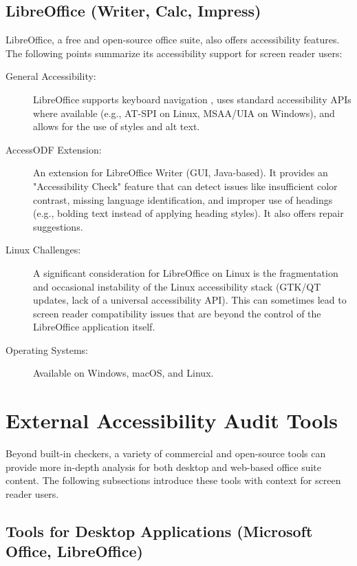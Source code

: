\subsection{LibreOffice (Writer, Calc, Impress)}
\label{subsec:libreoffice-accessibility}
LibreOffice, a free and open-source office suite, also offers accessibility features. The following points summarize its accessibility support for screen reader users:
\begin{description}
    \item[General Accessibility:] LibreOffice supports keyboard navigation \cite{LibreOfficeKeyboard}, uses standard accessibility APIs where available (e.g., AT-SPI on Linux, MSAA/UIA on Windows), and allows for the use of styles and alt text.
    \item[AccessODF Extension:] \cite{AccessODF} An extension for LibreOffice Writer (GUI, Java-based). It provides an "Accessibility Check" feature that can detect issues like insufficient color contrast, missing language identification, and improper use of headings (e.g., bolding text instead of applying heading styles). It also offers repair suggestions.
    \item[Linux Challenges:] A significant consideration for LibreOffice on Linux is the fragmentation and occasional instability of the Linux accessibility stack (GTK/QT updates, lack of a universal accessibility API). This can sometimes lead to screen reader compatibility issues that are beyond the control of the LibreOffice application itself.
    \item[Operating Systems:] Available on Windows, macOS, and Linux.
\end{description}

\section{External Accessibility Audit Tools}
\label{sec:office-external-tools}

Beyond built-in checkers, a variety of commercial and open-source tools can provide more in-depth analysis for both desktop and web-based office suite content. The following subsections introduce these tools with context for screen reader users.

\subsection{Tools for Desktop Applications (Microsoft Office, LibreOffice)}
\label{subsec:desktop-audit-tools}

